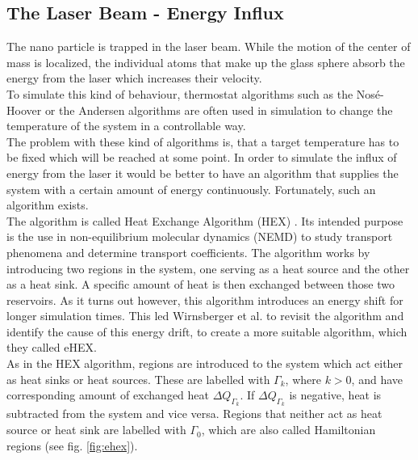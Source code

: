 \documentclass[12pt]{article}
\begin{document}
\subsection{The Laser Beam - Energy Influx}
The nano particle is trapped in the laser beam. While the motion of the center of mass is localized, the
individual atoms that make up the glass sphere absorb the energy from the laser which increases their velocity.\\
To simulate this kind of behaviour, thermostat algorithms \cite{Huenenberger2005} such as the Nos\'e-Hoover \cite{Nose1984,Hoover1985} or the Andersen
\cite{Andersen1980} algorithms are often used in simulation to change the temperature of the system in a controllable way.\\
The problem with these kind of algorithms is, that a target temperature has to be fixed which will be reached at some point. In order to simulate the
influx of energy from the laser it would be better to have an algorithm that supplies the system with a certain amount of energy continuously.
Fortunately, such an algorithm exists.\\
The algorithm is called Heat Exchange Algorithm (HEX) \cite{Hafskjold1993}. Its intended purpose is the use in non-equilibrium molecular dynamics
(NEMD) to study transport phenomena and determine transport coefficients. The algorithm works by introducing two regions in the system, one serving as
a heat source and the other as a heat sink. A specific amount of heat is then exchanged between those two reservoirs. As it turns out however, this
algorithm introduces an energy shift for longer simulation times. This led Wirnsberger et al. \cite{Wirnsberger2015} to revisit the algorithm and 
identify the cause of this energy drift, to create a more suitable algorithm, which they called eHEX.\\
As in the HEX algorithm, regions are introduced to the system which act either as heat sinks or heat sources. These are labelled with $\Gamma_k$,
where $k > 0$, and have corresponding amount of exchanged heat $\Delta Q_{\Gamma_k}$. If $\Delta Q_{\Gamma_k}$ is negative, heat is subtracted from
the system and vice versa. Regions that neither act as heat source or heat sink are labelled with $\Gamma_0$, which are also called
Hamiltonian regions (see fig. \ref{fig:ehex}). 
\end{document}
